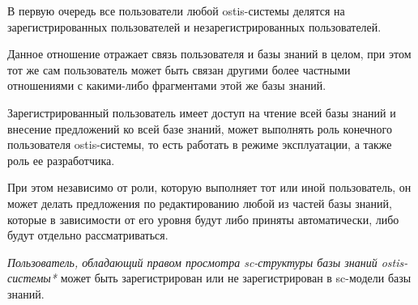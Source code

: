 В первую очередь все пользователи любой ostis-системы делятся на зарегистрированных пользователей и незарегистрированных пользователей.

\begin{SCn}

\begin{scnindent}
	\begin{scneqtoset}
	\end{scneqtoset}
\end{scnindent}
\end{SCn}

Данное отношение отражает связь пользователя и базы знаний в целом, при этом тот же сам пользователь может быть связан другими более частными отношениями с какими-либо фрагментами этой же базы знаний.

Зарегистрированный пользователь имеет доступ на чтение всей базы знаний и внесение предложений ко всей базе знаний, может выполнять роль конечного пользователя ostis-системы, то есть работать в режиме эксплуатации, а также роль ее разработчика. 

При этом независимо от роли, которую выполняет тот или иной пользователь, он может делать предложения по редактированию любой из частей базы знаний, которые в зависимости от его уровня будут либо приняты автоматически, либо будут отдельно рассматриваться.


\begin{SCn}
\end{SCn}

\textit{Пользователь, обладающий правом просмотра sc-структуры базы знаний ostis-системы*} может быть зарегистрирован или не зарегистрирован в sc-модели базы знаний.

